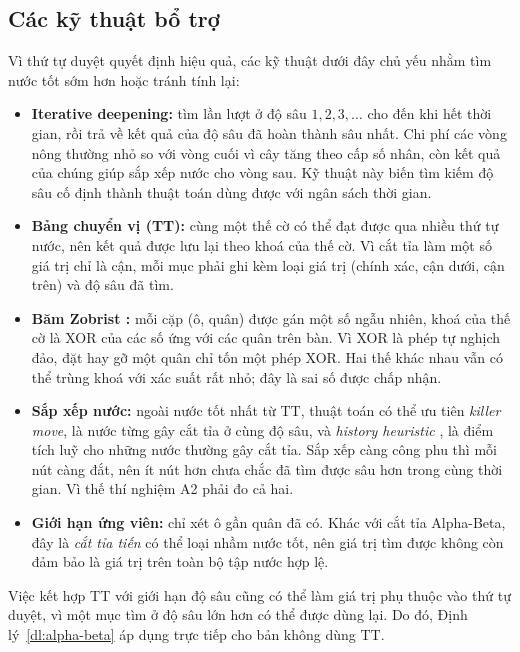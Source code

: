 \subsection{Các kỹ thuật bổ trợ}
\label{sec:lt-bo-tro}
Vì thứ tự duyệt quyết định hiệu quả, các kỹ thuật dưới đây chủ yếu nhằm tìm nước tốt sớm hơn hoặc tránh tính lại:
\begin{itemize}
  \item \textbf{Iterative deepening:} tìm lần lượt ở độ sâu $1, 2, 3, \dots$ cho đến khi hết thời gian, rồi trả về kết quả của độ sâu đã hoàn thành sâu nhất. Chi phí các vòng nông thường nhỏ so với vòng cuối vì cây tăng theo cấp số nhân, còn kết quả của chúng giúp sắp xếp nước cho vòng sau. Kỹ thuật này biến tìm kiếm độ sâu cố định thành thuật toán dùng được với ngân sách thời gian.
  \item \textbf{Bảng chuyển vị (TT):} cùng một thế cờ có thể đạt được qua nhiều thứ tự nước, nên kết quả được lưu lại theo khoá của thế cờ. Vì cắt tỉa làm một số giá trị chỉ là cận, mỗi mục phải ghi kèm loại giá trị (chính xác, cận dưới, cận trên) và độ sâu đã tìm.
  \item \textbf{Băm Zobrist \cite{zobrist1970}:} mỗi cặp (ô, quân) được gán một số ngẫu nhiên, khoá của thế cờ là XOR của các số ứng với các quân trên bàn. Vì XOR là phép tự nghịch đảo, đặt hay gỡ một quân chỉ tốn một phép XOR. Hai thế khác nhau vẫn có thể trùng khoá với xác suất rất nhỏ; đây là sai số được chấp nhận.
  \item \textbf{Sắp xếp nước:} ngoài nước tốt nhất từ TT, thuật toán có thể ưu tiên \emph{killer move}, là nước từng gây cắt tỉa ở cùng độ sâu, và \emph{history heuristic} \cite{schaeffer1989history}, là điểm tích luỹ cho những nước thường gây cắt tỉa. Sắp xếp càng công phu thì mỗi nút càng đắt, nên ít nút hơn chưa chắc đã tìm được sâu hơn trong cùng thời gian. Vì thế thí nghiệm A2 phải đo cả hai.
  \item \textbf{Giới hạn ứng viên:} chỉ xét ô gần quân đã có. Khác với cắt tỉa Alpha-Beta, đây là \emph{cắt tỉa tiến} có thể loại nhầm nước tốt, nên giá trị tìm được không còn đảm bảo là giá trị trên toàn bộ tập nước hợp lệ.
\end{itemize}

Việc kết hợp TT với giới hạn độ sâu cũng có thể làm giá trị phụ thuộc vào thứ tự duyệt, vì một mục tìm ở độ sâu lớn hơn có thể được dùng lại. Do đó, Định lý~\ref{dl:alpha-beta} áp dụng trực tiếp cho bản không dùng TT.

